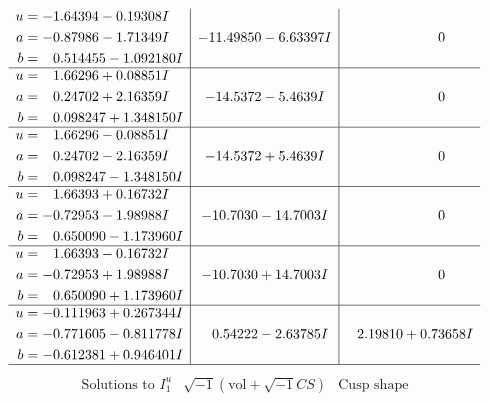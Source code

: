 \documentclass[1p]{elsarticle_modified}
\theoremstyle{definition}
\newcommand{\I}{\sqrt{-1}}
\begin{document}
$$\begin{array}{c|c|c}
\begin{aligned}
u &= -1.64394 - 0.19308 I \\
a &= -0.87986 - 1.71349 I \\
b &= \phantom{-}0.514455 - 1.092180 I\end{aligned}
 & -11.49850 - 6.63397 I & \phantom{-0.000000 } 0 \\ \hline\begin{aligned}
u &= \phantom{-}1.66296 + 0.08851 I \\
a &= \phantom{-}0.24702 + 2.16359 I \\
b &= \phantom{-}0.098247 + 1.348150 I\end{aligned}
 & -14.5372 - 5.4639 I & \phantom{-0.000000 } 0 \\ \hline\begin{aligned}
u &= \phantom{-}1.66296 - 0.08851 I \\
a &= \phantom{-}0.24702 - 2.16359 I \\
b &= \phantom{-}0.098247 - 1.348150 I\end{aligned}
 & -14.5372 + 5.4639 I & \phantom{-0.000000 } 0 \\ \hline\begin{aligned}
u &= \phantom{-}1.66393 + 0.16732 I \\
a &= -0.72953 - 1.98988 I \\
b &= \phantom{-}0.650090 - 1.173960 I\end{aligned}
 & -10.7030 - 14.7003 I & \phantom{-0.000000 } 0 \\ \hline\begin{aligned}
u &= \phantom{-}1.66393 - 0.16732 I \\
a &= -0.72953 + 1.98988 I \\
b &= \phantom{-}0.650090 + 1.173960 I\end{aligned}
 & -10.7030 + 14.7003 I & \phantom{-0.000000 } 0 \\ \hline\begin{aligned}
u &= -0.111963 + 0.267344 I \\
a &= -0.771605 - 0.811778 I \\
b &= -0.612381 + 0.946401 I\end{aligned}
 & \phantom{-}0.54222 - 2.63785 I & \phantom{-}2.19810 + 0.73658 I\\
 \hline 
 \end{array}$$\newpage$$\begin{array}{c|c|c}  
\text{Solutions to }I^u_{1}& \I (\text{vol} + \sqrt{-1}CS) & \text{Cusp shape}\\
 \hline 
\begin{aligned}

\end{aligned}
\end{array}$$
\end{document}
